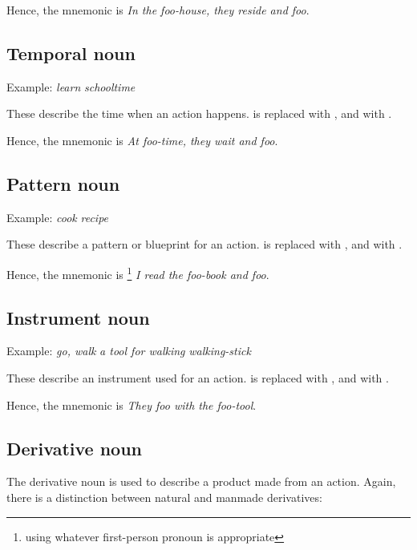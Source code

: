 \documentclass{book}
\begin{document}
Hence, the mnemonic is  \emph{In the foo-house, they reside and foo}.

\subsection{Temporal noun}

Example:  \emph{learn} \ra{}  \emph{schooltime}

These describe the time when an action happens.  is replaced with , and  with .

Hence, the mnemonic is  \emph{At foo-time, they wait and foo}.

\subsection{Pattern noun}

Example:  \emph{cook} \ra{}  \emph{recipe}

These describe a pattern or blueprint for an action.  is replaced with , and  with .

Hence, the mnemonic is \footnote{using whatever first-person pronoun is appropriate} \emph{I read the foo-book and foo}.

\subsection{Instrument noun}

Example:  \emph{go, walk} \ra{}  \emph{a tool for walking} \ra{}  \emph{walking-stick}

These describe an instrument used for an action.  is replaced with , and  with .

Hence, the mnemonic is  \emph{They foo with the foo-tool}.

\subsection{Derivative noun}

The derivative noun is used to describe a product made from an action. Again, there is a distinction between natural and manmade derivatives:
\end{document}
